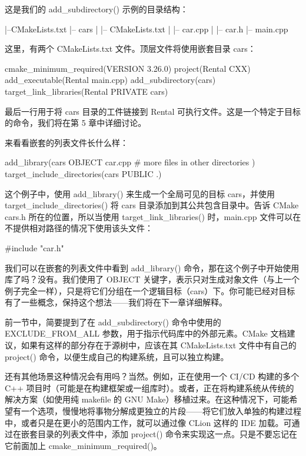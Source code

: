 这是我们的 add\_subdirectory() 示例的目录结构：

\begin{shell}
|--CMakeLists.txt
|-- cars
|   |-- CMakeLists.txt
|   |-- car.cpp
|   |-- car.h
|-- main.cpp
\end{shell}

这里，有两个 CMakeLists.txt 文件。顶层文件将使用嵌套目录 cars：


\begin{cmake}
cmake_minimum_required(VERSION 3.26.0)
project(Rental CXX)
add_executable(Rental main.cpp)
add_subdirectory(cars)
target_link_libraries(Rental PRIVATE cars)
\end{cmake}

最后一行用于将 cars 目录的工件链接到 Rental 可执行文件。这是一个特定于目标的命令，我们将在第 5 章中详细讨论。

来看看嵌套的列表文件长什么样：


\begin{cmake}
add_library(cars OBJECT
    car.cpp
# more files in other directories
)
target_include_directories(cars PUBLIC .)
\end{cmake}

这个例子中，使用 add\_library() 来生成一个全局可见的目标 cars，并使用 target\_include\_directories() 将 cars 目录添加到其公共包含目录中。告诉 CMake cars.h 所在的位置，所以当使用 target\_link\_libraries() 时，main.cpp 文件可以在不提供相对路径的情况下使用该头文件：

\begin{cpp}
#include "car.h"
\end{cpp}

我们可以在嵌套的列表文件中看到 add\_library() 命令，那在这个例子中开始使用库了吗？没有。我们使用了 OBJECT 关键字，表示只对生成对象文件（与上一个例子完全一样），只是将它们分组在一个逻辑目标（cars）下。你可能已经对目标有了一些概念，保持这个想法——我们将在下一章详细解释。


前一节中，简要提到了在 add\_subdirectory() 命令中使用的 EXCLUDE\_FROM\_ALL 参数，用于指示代码库中的外部元素。CMake 文档建议，如果有这样的部分存在于源树中，应该在其 CMakeLists.txt 文件中有自己的 project() 命令，以便生成自己的构建系统，且可以独立构建。

还有其他场景这种情况会有用吗？当然。例如，正在使用一个 CI/CD 构建的多个 C++ 项目时（可能是在构建框架或一组库时）。或者，正在将构建系统从传统的解决方案（如使用纯 makefile 的 GNU Make）移植过来。在这种情况下，可能希望有一个选项，慢慢地将事物分解成更独立的片段——将它们放入单独的构建过程中，或者只是在更小的范围内工作，就可以通过像 CLion 这样的 IDE 加载。可通过在嵌套目录的列表文件中，添加 project() 命令来实现这一点。只是不要忘记在它前面加上 cmake\_minimum\_required()。

